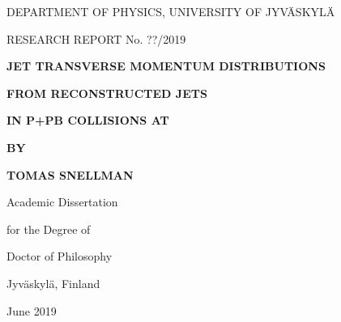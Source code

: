 



\thispagestyle{empty}
\vspace*{10mm}

\centerline{DEPARTMENT OF PHYSICS, UNIVERSITY OF JYV\"ASKYL\"A}
\centerline{RESEARCH REPORT No. ??/2019}

\vspace{25mm} 

\centerline{\bf JET TRANSVERSE MOMENTUM DISTRIBUTIONS }
\centerline{\bf  FROM RECONSTRUCTED JETS}

\centerline{\bf  IN P+PB COLLISIONS AT }
\centerline{\bf }

\vspace{13mm}


\centerline{\bf BY}
\centerline{\bf TOMAS SNELLMAN}

\vspace{13mm}

\centerline{Academic Dissertation}
\centerline{for the Degree of}
\centerline{Doctor of Philosophy}

\vspace{13mm}


\vspace{13mm}




\centerline{Jyv\"askyl\"a, Finland}
\centerline{June 2019}

\pagebreak
\thispagestyle{empty}

\vspace*{25mm} 

